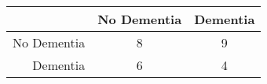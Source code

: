 \begin{table}[ht]
\centering
\begin{tabular}{r|c|c}
  \hline
 & No Dementia & Dementia \\ 
  \hline
No Dementia & 8 & 9 \\ 
  Dementia & 6 & 4 \\ 
   \hline
\end{tabular}
\end{table}

